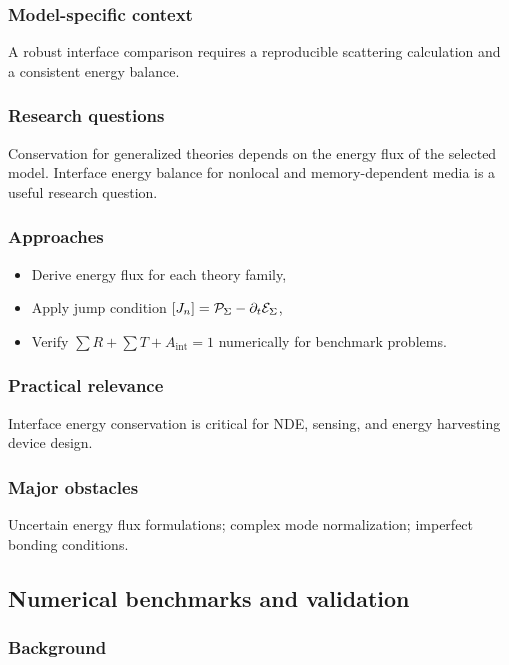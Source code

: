 \subsubsection{Model-specific context}

A robust interface comparison requires a reproducible scattering calculation and a consistent energy balance.

\subsubsection{Research questions}

Conservation for generalized theories depends on the energy flux of the selected model. Interface energy balance for nonlocal and memory-dependent media is a useful research question.

\subsubsection{Approaches}

\begin{itemize}
\item Derive energy flux for each theory family,
\item Apply jump condition $\left[ J_n \right] = \mathcal{P}_\Sigma - \partial_t\mathcal{E}_\Sigma$,
\item Verify $\sum R + \sum T + A_{\mathrm{int}} = 1$ numerically for benchmark problems.
\end{itemize}

\subsubsection{Practical relevance}

Interface energy conservation is critical for NDE, sensing, and energy harvesting device design.

\subsubsection{Major obstacles}

Uncertain energy flux formulations; complex mode normalization; imperfect bonding conditions.

\subsection{Numerical benchmarks and validation}
\label{sec:15.3}

\subsubsection{Background}


